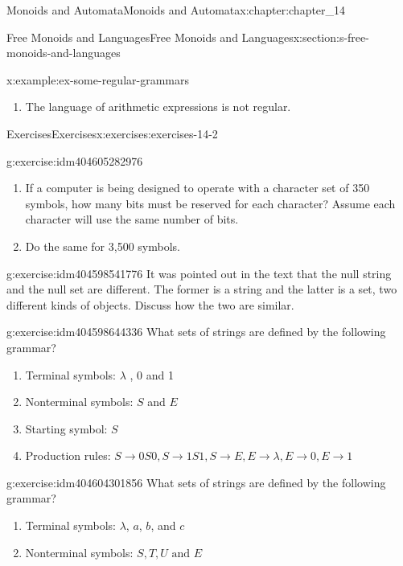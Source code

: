 \documentclass[twoside,10pt,]{book}
\numberwithin{equation}{section}
\begin{document}
\begin{chapterptx}{Monoids and Automata}{}{Monoids and Automata}{}{}{x:chapter:chapter_14}
\begin{sectionptx}{Free Monoids and Languages}{}{Free Monoids and Languages}{}{}{x:section:s-free-monoids-and-languages}
\begin{example}{}{x:example:ex-some-regular-grammars}
\begin{enumerate}[label=(\alph*)]
\item{}The language of arithmetic expressions is not regular.%
\end{enumerate}
%
\end{example}
%
%
\typeout{************************************************}
\typeout{************************************************}
%
\begin{exercises-subsection}{Exercises}{}{Exercises}{}{}{x:exercises:exercises-14-2}
\begin{divisionexercise}{1}{}{}{g:exercise:idm404605282976}%
%
\begin{enumerate}[label=(\alph*)]
\item{}If a computer is being designed to operate with a character set of 350 symbols, how many bits must be reserved for each character? Assume each character will use the same number of bits.%
\item{}Do the same for 3,500 symbols.%
\end{enumerate}
%
\end{divisionexercise}%
\begin{divisionexercise}{2}{}{}{g:exercise:idm404598541776}%
It was pointed out in the text that the null string and the null set are different. The former is a string and the latter is a set, two different kinds of objects. Discuss how the two are similar.%
\end{divisionexercise}%
\begin{divisionexercise}{3}{}{}{g:exercise:idm404598644336}%
What sets of strings are defined by the following grammar?%
\begin{enumerate}[label=(\alph*)]
\item{}Terminal symbols: \(\lambda\) , 0 and 1%
\item{}Nonterminal symbols: \(S\) and \(E\)%
\item{}Starting symbol: \(S\)%
\item{}Production rules: \(S\to 0S0, S \to 1S1, S\to E, E \to \lambda, E\to 0, E\to 1\)%
\end{enumerate}
%
\end{divisionexercise}%
\begin{divisionexercise}{4}{}{}{g:exercise:idm404604301856}%
What sets of strings are defined by the following grammar?%
\begin{enumerate}[label=(\alph*)]
\item{}Terminal symbols: \(\lambda\), \(a\), \(b\), and \(c\)%
\item{}Nonterminal symbols: \(S, T, U \textrm{ and } E\)%

\end{enumerate}
\end{divisionexercise}
\end{exercises-subsection}
\end{sectionptx}
\end{chapterptx}
\end{document}
